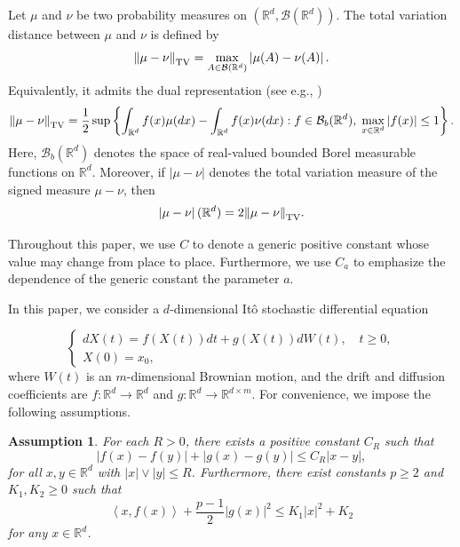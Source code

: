 \documentclass[preprint,12pt,compress]{elsarticle}
\newtheorem{assumption}[theorem]{Assumption}
\begin{document}
Let $\mu$ and $\nu$ be two probability measures on $(\mathbb{R}^d, \mathcal{B}(\mathbb{R}^d))$. The total variation distance between $\mu$ and $\nu$ is defined by
\begin{equation}
	{\left\| {\mu  - \nu } \right\|_{\rm TV}} = \mathop {\max }\limits_{A \in \mathcal{B}(\mathbb{R}^d)} \left| {\mu (A) - \nu (A)} \right|.
\end{equation}
Equivalently, it admits the dual representation (see e.g., \cite[p. 49]{levin2017markov})
\begin{equation}  \label{aa2}
	{\left\| {\mu  - \nu } \right\|_{\rm TV}} = \frac{1}{2}\sup \left\{ {\int_{{\mathbb{R}^d}} {f(x)\mu (dx)}  - \int_{{\mathbb{R}^d}} {f(x)\nu (dx)} :f \in \mathcal{B}_b (\mathbb{R}^d), \; \mathop {\max }\limits_{x \in {\mathbb{R}^d}} \left| {f(x)} \right| \le 1} \right\}.
\end{equation}
Here, $\mathcal{B}_b (\mathbb{R}^d)$ denotes the space of real-valued bounded Borel measurable functions on $\mathbb{R}^d$.
Moreover, if $|\mu-\nu|$ denotes the total variation measure of the signed measure $\mu-\nu$, then
\begin{equation}  \label{aa1}
	\left| {\mu  - \nu } \right|({\mathbb{R}^d}) = 2{\left\| {\mu  - \nu } \right\|_{\rm TV}} .
\end{equation}


Throughout this paper, we use $C$ to denote a generic positive constant whose value may change from place to place. Furthermore, we use $C_a$ to emphasize the dependence of the generic constant the parameter $a$.

In this paper, we consider a $d$-dimensional It\^o stochastic differential equation 

\begin{equation}  \label{equation}
	\left\{  
	\begin{array}{l}
		dX(t) = f(X(t))dt + g(X(t))dW(t), \quad t \ge 0,  \\
		X(0) = x_0,
	\end{array}
	\right.
\end{equation}
where $W(t)$ is an $m$-dimensional Brownian motion, and the drift and diffusion coefficients are $f:{\mathbb{R}^d} \to {\mathbb{R}^d}$ and $g:{\mathbb{R}^d} \to {\mathbb{R}^{d \times m}}$. For convenience, we impose the following assumptions.

\begin{assumption}  \label{A2.1}
	 For each $R > 0$, there exists a positive constant $C_R$ such that
	\begin{equation} \label{llc}
		\left| {f(x) - f(y)} \right| + \left| {g(x) - g(y)} \right| \le {C_R}\left| {x - y} \right|,
	\end{equation}
	for all $x, y \in \mathbb{R}^d$ with $\left| x \right| \vee \left| y \right| \le R$. Furthermore, there exist constants $p \ge 2$ and $K_1, K_2 \ge 0$ such that 
	\begin{equation}  \label{A2.1-1}
		\left\langle {x,f(x)} \right\rangle  + \frac{{p - 1}}{2}{\left| {g(x)} \right|^2} \le {K_1}{\left| x \right|^2} + {K_2}
	\end{equation} 
	for any $x \in \mathbb{R}^d$. 
\end{assumption}
\end{document}
